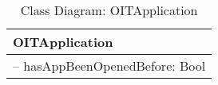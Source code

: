 \begin{table}[H]
\centering
\caption{Class Diagram: OITApplication}

\hspace{1em}
\renewcommand{\arraystretch}{1.7}

\begin{tabular}{|l|}
\hline
\textbf{OITApplication} \\
\hline
– hasAppBeenOpenedBefore: Bool \\
\hline
\end{tabular}
\end{table}
